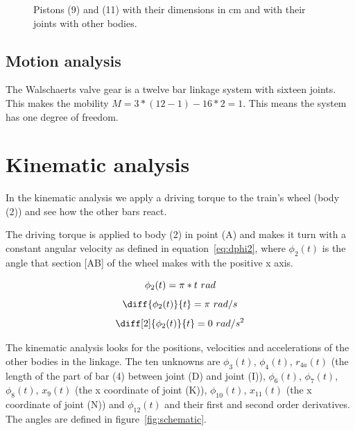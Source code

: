 \documentclass[a4paper]{article}
\begin{document}
\begin{figure}
	\caption{Pistons (9) and (11) with their dimensions in cm and with their joints with other bodies.}
	\label{fig:pistons}
	
\end{figure}



\subsection{Motion analysis}

The Walschaerts valve gear is a twelve bar linkage system with sixteen joints. This makes the mobility \(M=3*(12-1)-16*2=1\). This means the system has one degree of freedom.


\newpage

\section{Kinematic analysis}
\label{sec:kin}

In the kinematic analysis we apply a driving torque to the train's wheel (body (2)) and see how the other bars react. 

The driving torque is applied to body (2) in point (A) and makes it turn with a constant angular velocity as defined in equation~\ref{eq:dphi2}, where \(\phi_2(t)\) is the angle that section [AB] of the wheel makes with the positive x axis.

\begin{equation}
	\phi_2(t) = \pi*t~rad \\
	\label{eq:phi2}
\end{equation}
\begin{equation}
	\diff{\phi_2(t)}{t} = \pi~rad/s \\
	\label{eq:dphi2}
\end{equation}
\begin{equation}
	\diff[2]{\phi_2(t)}{t} = 0~rad/s^2\\
\end{equation}

The kinematic analysis looks for the positions, velocities and accelerations of the other bodies in the linkage. The ten unknowns are \(\phi_3(t)\), \(\phi_4(t)\), \(r_{4a}(t)\) (the length of the part of bar (4) between joint (D) and joint (I)), \(\phi_6(t)\), \(\phi_7(t)\), \(\phi_8(t)\), \(x_9(t)\) (the x coordinate of joint (K)), \(\phi_{10}(t)\), \(x_{11}(t)\) (the x coordinate of joint (N)) and \(\phi_{12}(t)\) and their first and second order derivatives. The angles are defined in figure~\ref{fig:schematic}.
\end{document}
